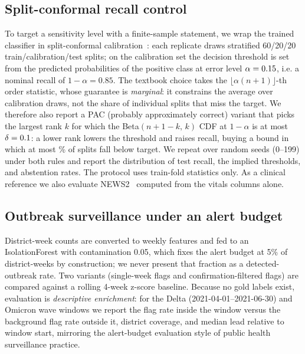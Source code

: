 \documentclass[conference]{IEEEtran}
\begin{document}
\subsection{Split-conformal recall control}
\label{sec:conformal-method}

To target a sensitivity level with a finite-sample statement, we wrap the
trained classifier in split-conformal calibration~\cite{vovk2005algorithmic,
angelopoulos2021gentle}: each replicate draws stratified 60/20/20
train/calibration/test splits; on the calibration set the decision threshold
is set from the predicted probabilities of the positive class at error level
$\alpha=0.15$, i.e. a nominal recall of $1-\alpha=0.85$. The textbook
choice takes the $\lfloor\alpha(n+1)\rfloor$-th order statistic, whose
guarantee is \emph{marginal}: it constrains the average over calibration
draws, not the share of individual splits that miss the target. We therefore
also report a PAC (probably approximately correct) variant that picks the
largest rank $k$ for which the Beta$(n{+}1{-}k,\,k)$ CDF at $1-\alpha$ is at
most $\delta=0.1$: a lower rank lowers the threshold and raises recall,
buying a bound in which at most \PacDeltaPct\% of splits fall below
target. We repeat over \CNseeds{} random seeds (0--199) under both rules and
report the distribution of test recall, the implied thresholds, and
abstention rates. The protocol uses train-fold statistics only. As a clinical
reference we also evaluate NEWS2~\cite{rcp2017news2,smith2019news2} computed
from the vitals columns alone.

\subsection{Outbreak surveillance under an alert budget}
\label{sec:outbreak-method}

District-week counts are converted to weekly features and fed to an
IsolationForest with contamination 0.05, which fixes the alert budget at 5\%
of district-weeks by construction; we never present that fraction as a
detected-outbreak rate. Two variants (single-week flags and
confirmation-filtered flags) are compared against a rolling 4-week z-score
baseline. Because no gold labels exist, evaluation
is \emph{descriptive enrichment}: for the Delta (2021-04-01--2021-06-30) and
Omicron wave windows we report the flag rate inside the window versus the
background flag rate outside it, district coverage, and median lead relative
to window start, mirroring the alert-budget evaluation style of public
health surveillance practice.
\end{document}
